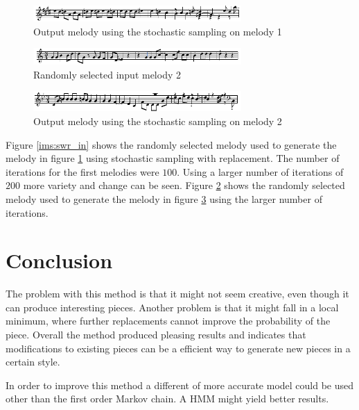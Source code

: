 \begin{figure}[h!]
\centerline{\includegraphics[width=300px]{../images/swr_out.pdf}}
\caption{Output melody using the stochastic sampling on melody 1}
\label{ims:swr_out}
\end{figure}

\begin{figure}[h!]
\centerline{\includegraphics[width=300px]{../images/swr_in2.pdf}}
\caption{Randomly selected input melody 2}
\label{ims:swr_in2}
\end{figure}

\begin{figure}[h!]
\centerline{\includegraphics[width=300px]{../images/swr_out2.pdf}}
\caption{Output melody using the stochastic sampling on melody 2}
\label{ims:swr_out2}
\end{figure}

Figure \ref{ims:swr_in} shows the randomly selected melody used to generate the melody in figure \ref{ims:swr_out} using stochastic sampling with replacement. The number of iterations for the first melodies were $100$.
Using a larger number of iterations of $200$ more variety and change can be seen. Figure \ref{ims:swr_in2} shows the randomly selected melody used to generate the melody in figure \ref{ims:swr_out2} using the larger number of iterations.


\section{Conclusion}
The problem with this method is that it might not seem creative, even though it can produce interesting pieces. Another problem is that it might fall in a local minimum, where further replacements cannot improve the probability of the piece. 
Overall the method produced pleasing results and indicates that modifications to existing pieces can be a efficient way to generate new pieces in a certain style.

In order to improve this method a different of more accurate model could be used other than the first order Markov chain. A \ac{HMM} might yield better results.
